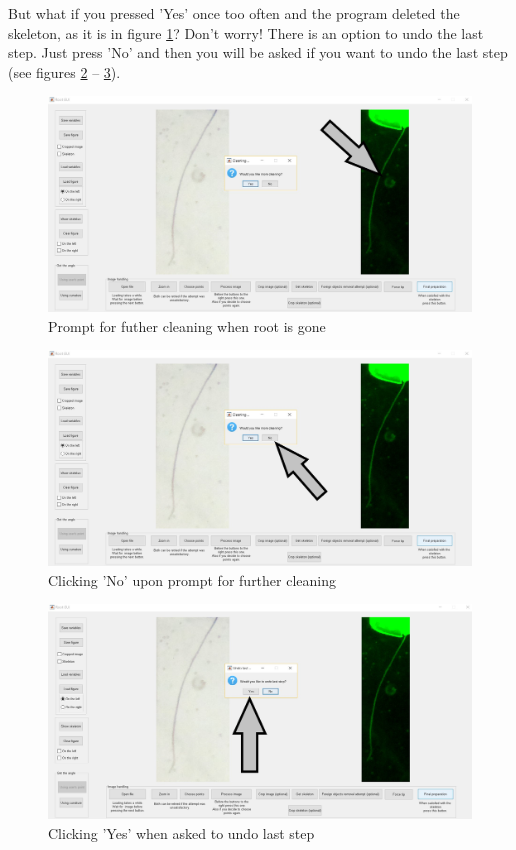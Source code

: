 But what if you pressed 'Yes' once too often and the program deleted the skeleton, as it is in figure \ref{fig:img33}? 
Don't worry! There is an option to undo the last step. 
Just press 'No' and then you will be asked if you want to undo the last step (see figures \ref{fig:img34} -- \ref{fig:img35}).

\begin{figure}[H]
	\centering
	\includegraphics[width=\textwidth]{../Figures/manual/optionalA4.jpg}
	\caption{Prompt for futher cleaning when root is gone}
	\label{fig:img33}
\end{figure}

\begin{figure}[H]
	\centering
	\includegraphics[width=\textwidth]{../Figures/manual/optionalA5.jpg}
	\caption{Clicking 'No' upon prompt for further cleaning}
	\label{fig:img34}
\end{figure}

\begin{figure}[H]
	\centering
	\includegraphics[width=\textwidth]{../Figures/manual/optionalA6.jpg}
	\caption{Clicking 'Yes' when asked to undo last step}
	\label{fig:img35}
\end{figure}

